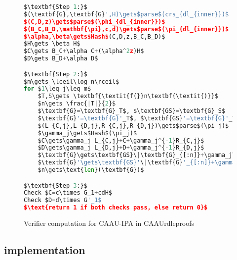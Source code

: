 \begin{figure}[ht]\label{fig:ipa-verifier}
\begin{framed}
\begin{lstlisting}[language=Python,mathescape=true,label={lst:ipa-verifier}]
$\textbf{Step 1:}$
$(\textbf{G},\textbf{G}',H)\gets$parse$(crs_{dl_{inner}})$
$(C,D,z)\gets$parse$(\phi_{dl_{inner}})$
$(B_C,B_D,\mathbf{\pi},c,d)\gets$parse$(\pi_{dl_{inner}})$
$\alpha,\beta\gets$Hash$(C,D,z,B_C,B_D)$
$H\gets \beta H$
$C\gets B_C+\alpha C+(\alpha^2z)H$
$D\gets B_D+\alpha D$

$\textbf{Step 2:}$
$m\gets \lceil\log n\rceil$
for $1\leq j\leq m$
    $T,S\gets \textbf{\textit{f(}}n\textbf{\textit{)}}$
    $n\gets \frac{|T|}{2}$
    $\textbf{G}=\textbf{G}_T$, $\textbf{GS}=\textbf{G}_S$
    $\textbf{G}'=\textbf{G}'_T$, $\textbf{GS}'=\textbf{G}'_T$
    $(L_{C,j},L_{D,j},R_{C,j},R_{D,j})\gets$parse$(\pi_j)$
    $\gamma_j\gets$Hash$(\pi_j)$
    $C\gets\gamma_j L_{C,j}+C+\gamma_j^{-1}R_{C,j}$
    $D\gets\gamma_j L_{D,j}+D+\gamma_j^{-1}R_{D,j}$
    $\textbf{G}\gets\textbf{GS}\|\textbf{G}_{[:n]}+\gamma_j\textbf{G}_{[n:]}$
    $\textbf{G}'\gets\textbf{GS}'\|\textbf{G}'_{[:n]}+\gamma_j^{-1}\textbf{G}'_{[n:]}$
    $n\gets\text{len}(\textbf{G})$

$\textbf{Step 3:}$
Check $C=c\times G_1+cdH$
Check $D=d\times G'_1$
$\text{return 1 if both checks pass, else return 0}$
\end{lstlisting}
\end{framed}
\caption{Verifier computation for CAAU-IPA in CAAUrdleproofs}
\end{figure}



\subsection{implementation}\label{subsec:approach-implementation}


